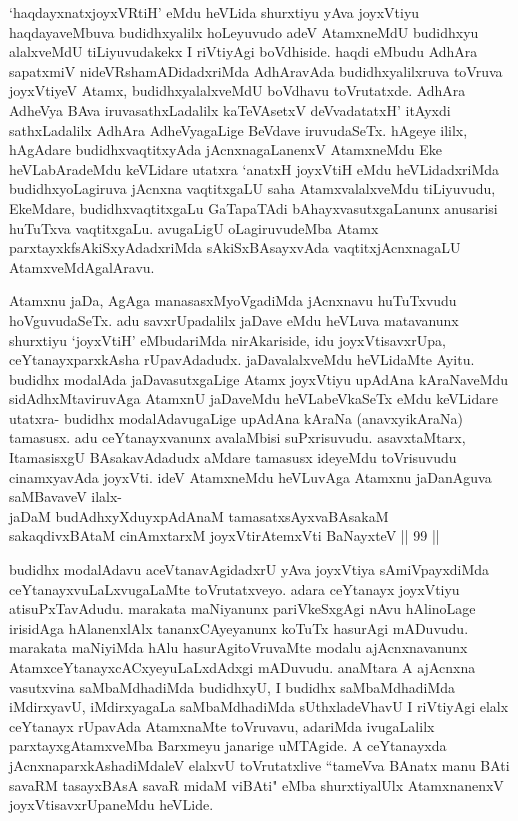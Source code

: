 \begin{artha}
`haqdayxnatxjoyxVRtiH' eMdu heVLida shurxtiyu yAva joyxVtiyu haqdayaveMbuva budidhxyalilx hoLeyuvudo adeV AtamxneMdU budidhxyu alalxveMdU tiLiyuvudakekx I riVtiyAgi boVdhiside. haqdi eMbudu AdhAra sapatxmiV nideVRshamADidadxriMda AdhAravAda budidhxyalilxruva toVruva joyxVtiyeV Atamx, budidhxyalalxveMdU boVdhavu toVrutatxde. AdhAra AdheVya BAva iruvasathxLadalilx kaTeVAsetxV deVvadatatxH' itAyxdi sathxLadalilx AdhAra AdheVyagaLige BeVdave iruvudaSeTx. hAgeye ililx, hAgAdare budidhxvaqtitxyAda jAcnxnagaLanenxV AtamxneMdu Eke heVLabAradeMdu keVLidare utatxra `anatxH joyxVtiH eMdu heVLidadxriMda budidhxyoLagiruva jAcnxna vaqtitxgaLU saha AtamxvalalxveMdu tiLiyuvudu, EkeMdare, budidhxvaqtitxgaLu GaTapaTAdi bAhayxvasutxgaLanunx anusarisi huTuTxva vaqtitxgaLu. avugaLigU oLagiruvudeMba Atamx parxtayxkfsAkiSxyAdadxriMda sAkiSxBAsayxvAda vaqtitxjAcnxnagaLU AtamxveMdAgalAravu. 
\end{artha}


\begin{artha}
Atamxnu jaDa, AgAga manasasxMyoVgadiMda jAcnxnavu huTuTxvudu hoVguvudaSeTx. adu savxrUpadalilx jaDave eMdu heVLuva matavanunx shurxtiyu `joyxVtiH' eMbudariMda nirAkariside, idu joyxVtisavxrUpa, ceYtanayxparxkAsha rUpavAdadudx. jaDavalalxveMdu heVLidaMte Ayitu. budidhx modalAda jaDavasutxgaLige Atamx joyxVtiyu upAdAna kAraNaveMdu sidAdhxMtaviruvAga AtamxnU jaDaveMdu heVLabeVkaSeTx eMdu keVLidare utatxra- budidhx modalAdavugaLige upAdAna kAraNa (anavxyikAraNa) tamasusx. adu ceYtanayxvanunx avalaMbisi suPxrisuvudu. asavxtaMtarx, ItamasisxgU BAsakavAdadudx aMdare tamasusx ideyeMdu toVrisuvudu cinamxyavAda joyxVti. ideV AtamxneMdu heVLuvAga Atamxnu jaDanAguva saMBavaveV ilalx-\\
jaDaM budAdhxyXduyxpAdAnaM tamasatxsAyxvaBAsakaM\\
sakaqdivxBAtaM cinAmxtarxM joyxVtirAtemxVti BaNayxteV || 99 ||
\end{artha}

\begin{artha}
budidhx modalAdavu aceVtanavAgidadxrU yAva joyxVtiya sAmiVpayxdiMda ceYtanayxvuLaLxvugaLaMte toVrutatxveyo. adara ceYtanayx joyxVtiyu atisuPxTavAdudu. marakata maNiyanunx pariVkeSxgAgi nAvu hAlinoLage irisidAga hAlanenxlAlx tananxCAyeyanunx koTuTx hasurAgi mADuvudu. marakata maNiyiMda hAlu hasurAgitoVruvaMte modalu ajAcnxnavanunx AtamxceYtanayxcACxyeyuLaLxdAdxgi mADuvudu. anaMtara A ajAcnxna vasutxvina saMbaMdhadiMda budidhxyU, I budidhx saMbaMdhadiMda iMdirxyavU, iMdirxyagaLa saMbaMdhadiMda sUthxladeVhavU I riVtiyAgi elalx ceYtanayx rUpavAda AtamxnaMte toVruvavu, adariMda ivugaLalilx parxtayxgAtamxveMba Barxmeyu janarige uMTAgide. A ceYtanayxda jAcnxnaparxkAshadiMdaleV elalxvU toVrutatxlive ``tameVva BAnatx manu BAti savaRM tasayxBAsA savaR midaM viBAti" eMba shurxtiyalUlx AtamxnanenxV joyxVtisavxrUpaneMdu heVLide. 
\end{artha}

